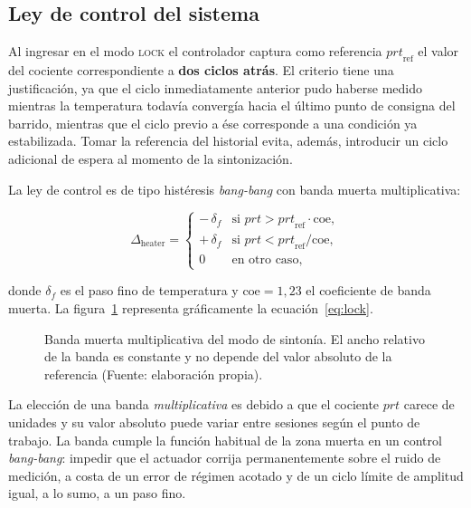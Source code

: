 \subsection{Ley de control del sistema}

Al ingresar en el modo \textsc{lock} el controlador captura como referencia $\mathit{prt}_{\mathrm{ref}}$ el valor del cociente correspondiente a \textbf{dos ciclos atrás}. El criterio tiene una justificación, ya que el ciclo inmediatamente anterior pudo haberse medido mientras la temperatura todavía convergía hacia el último punto de consigna del barrido, mientras que el ciclo previo a ése corresponde a una condición ya estabilizada. Tomar la referencia del historial evita, además, introducir un ciclo adicional de espera al momento de la sintonización.

La ley de control es de tipo histéresis \emph{bang-bang} con banda muerta multiplicativa:

\begin{equation}
  \Delta_{\text{heater}} =
  \begin{cases}
    -\,\delta_{f} & \text{si } \mathit{prt} > \mathit{prt}_{\mathrm{ref}}\cdot\mathrm{coe},\\[4pt]
    +\,\delta_{f} & \text{si } \mathit{prt} < \mathit{prt}_{\mathrm{ref}}/\mathrm{coe},\\[4pt]
    0             & \text{en otro caso},
  \end{cases}
  \label{eq:lock}
\end{equation}

donde $\delta_{f}$ es el paso fino de temperatura y $\mathrm{coe}=1{,}23$ el coeficiente de banda muerta. La figura~\ref{fig:fw-banda} representa gráficamente la ecuación~\ref{eq:lock}.

\begin{figure}[htbp]
\centering
\resizebox{0.95\textwidth}{!}{}
\caption[Banda muerta multiplicativa del modo de sintonía]%
{Banda muerta multiplicativa del modo de sintonía. El ancho relativo de la banda es constante y no depende del valor absoluto de la referencia (Fuente: elaboración propia).}
\label{fig:fw-banda}
\end{figure}

La elección de una banda \emph{multiplicativa} es debido a que el cociente $\mathit{prt}$ carece de unidades y su valor absoluto puede variar entre sesiones según el punto de trabajo. La banda cumple la función habitual de la zona muerta en un control \textit{bang-bang}: impedir que el actuador corrija permanentemente sobre el ruido de medición, a costa de un error de régimen acotado y de un ciclo límite de amplitud igual, a lo sumo, a un paso fino.

